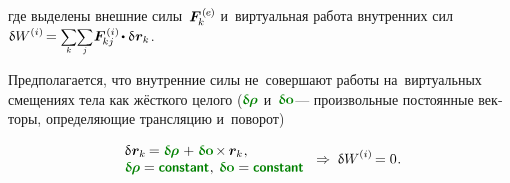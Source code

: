 \begin{otherlanguage}{russian}
\vspace{-0.1em}\noindent
где выделены внешние силы~${\bm{F}^{\smthexternal}_{\hspace{-0.16ex}k}}$ и~виртуальная работа внутренних сил
${\variation{\internalwork} \hspace{-0.12ex} = \scalebox{0.8}[0.84]{$\displaystyle \underset{\raisemath{.25ex}{\smash{k}}}{\sum}$} \scalebox{0.8}[0.84]{$\displaystyle \underset{\raisemath{.25ex}{\smash{j}}}{\sum}$} \hspace{.12ex} \bm{F}^{\smthinternal}_{\hspace{-0.16ex}kj} \hspace{-0.1ex} \dotp \variation{\hspace{.1ex}\locationvector_k} \hspace{.1ex}}$.

\vspace{-0.1em}
Предполагается, что внутренние силы не~совершают работы на~виртуальных смещениях тела как жёсткого целого (${\constvarvector{\hspace{-0.1ex}\bm{\rho}}}$ и~${\constvarvector{\bm{o}}}$\:--- произвольные постоянные векторы, определяющие трансляцию и~поворот)

\nopagebreak\vspace{-0.2em}\begin{equation}\label{assumptionforvirtualwork}
\begin{array}{l}
\variation{\hspace{.1ex}\locationvector_k} \hspace{-0.16ex}
= \constvarvector{\hspace{-0.1ex}\bm{\rho}} \hspace{.2ex} + \hspace{.12ex} \constvarvector{\bm{o}} \hspace{-0.2ex} \times \hspace{-0.1ex} \locationvector_k
\hspace{.1ex} ,
\\
\constvarvector{\hspace{-0.1ex}\bm{\rho}} = \boldconstant \hspace{.1ex} , \:
\constvarvector{\bm{o}} = \boldconstant
\end{array}
\hspace{.3ex} \Rightarrow \hspace{.6ex}
\variation{\internalwork} \hspace{-0.1ex} = 0 \hspace{.1ex}.
\end{equation}


\end{otherlanguage}
